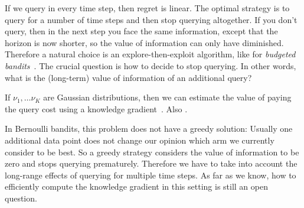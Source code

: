 \documentclass[a4paper]{article}
\begin{document}
If we query in every time step, then regret is linear.
The optimal strategy is to query for a number of time steps and then stop querying altogether.
If you don't query, then in the next step you face the same information, except that the horizon is now shorter,
so the value of information can only have diminished.
Therefore
a natural choice is an explore-then-exploit algorithm,
like for \emph{budgeted bandits}~\citep{Madani04}.
The crucial question is how to decide to stop querying.
In other words, what is the (long-term) value of information of an additional query?

If $\nu_1, \ldots \nu_K$ are Gaussian distributions,
then we can estimate the value of paying the query cost using
a knowledge gradient~\citep[Ch.~5]{PowellRyzhov12}.
Also \citet{Frazier08}.



In Bernoulli bandits, this problem does not have a greedy solution:
Usually one additional data point does not change our opinion
which arm we currently consider to be best.
So a greedy strategy considers the value of information to be zero and stops querying prematurely.
Therefore we have to take into account the long-range effects of querying for multiple time steps.
As far as we know, how to efficiently compute the knowledge gradient in this setting is still an open question.
\end{document}
